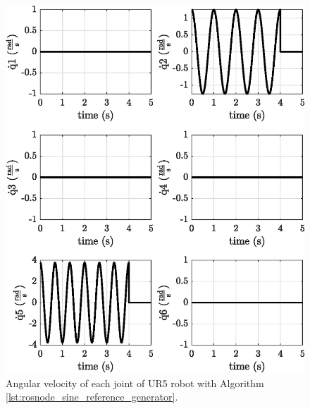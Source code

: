 \begin{figure}[H]
    \centering
    \includegraphics{images/act_1.1/joint_velocity.eps}
    \caption{Angular velocity of each joint of UR5 robot with Algorithm \ref{lst:rosnode_sine_reference_generator}.}
    \label{fig:act_1.1_joint_velocity}
\end{figure}

